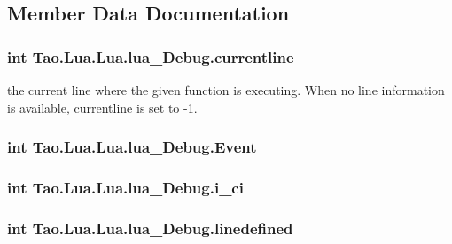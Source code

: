 \subsection{Member Data Documentation}
\hypertarget{struct_tao_1_1_lua_1_1_lua_1_1lua___debug_a29ab177a580d9627f898fa689b301e6b}{
\subsubsection[{currentline}]{\setlength{\rightskip}{0pt plus 5cm}int {\bf Tao.Lua.Lua.lua\_\-Debug.currentline}}}
\label{struct_tao_1_1_lua_1_1_lua_1_1lua___debug_a29ab177a580d9627f898fa689b301e6b}


the current line where the given function is executing. When no line information is available, currentline is set to -\/1. 

\hypertarget{struct_tao_1_1_lua_1_1_lua_1_1lua___debug_a3b330c9dd952e2724e3a87f50de08958}{
\subsubsection[{Event}]{\setlength{\rightskip}{0pt plus 5cm}int {\bf Tao.Lua.Lua.lua\_\-Debug.Event}}}
\label{struct_tao_1_1_lua_1_1_lua_1_1lua___debug_a3b330c9dd952e2724e3a87f50de08958}
\hypertarget{struct_tao_1_1_lua_1_1_lua_1_1lua___debug_a43d0c457affe69185de12e41896d00ca}{
\subsubsection[{i\_\-ci}]{\setlength{\rightskip}{0pt plus 5cm}int {\bf Tao.Lua.Lua.lua\_\-Debug.i\_\-ci}}}
\label{struct_tao_1_1_lua_1_1_lua_1_1lua___debug_a43d0c457affe69185de12e41896d00ca}
\hypertarget{struct_tao_1_1_lua_1_1_lua_1_1lua___debug_ab99a0300b91f16877bb1908ed1e4f763}{
\subsubsection[{linedefined}]{\setlength{\rightskip}{0pt plus 5cm}int {\bf Tao.Lua.Lua.lua\_\-Debug.linedefined}}}
\label{struct_tao_1_1_lua_1_1_lua_1_1lua___debug_ab99a0300b91f16877bb1908ed1e4f763}


